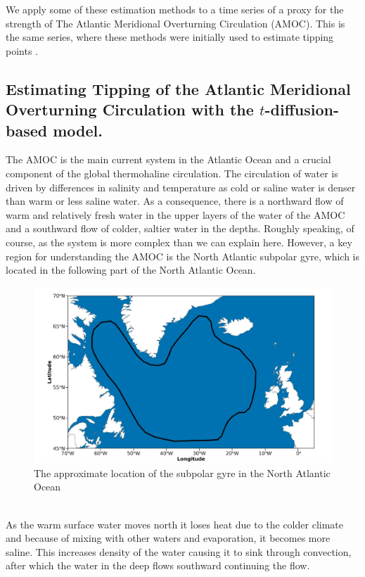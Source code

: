 We apply some of these estimation methods to a time series of a proxy for the strength of The Atlantic Meridional Overturning Circulation (AMOC). This is the same series,  where these methods were initially used to estimate tipping points \cite{Ditlevsen2023}.
\subsection{Estimating Tipping of the Atlantic Meridional Overturning Circulation with the \texorpdfstring{$t$}{t}-diffusion-based model.}
The AMOC is the main current system in the Atlantic Ocean and a crucial component of the global thermohaline circulation. The circulation of water is driven by differences in salinity and temperature as cold or saline water is denser than warm or less saline water. As a consequence, there is a northward flow of warm and relatively fresh water in the upper layers of the water of the AMOC and a southward flow of colder, saltier water in the depths. Roughly speaking, of course, as the system is more complex than we can explain here. However, a key region for understanding the AMOC is the North Atlantic subpolar gyre, which is located in the following part of the North Atlantic Ocean.
\begin{figure}[h!]
    \begin{center}
        \includegraphics[scale = .175]{figures/NorthAtlanticOcean.jpeg}
    \end{center}
    \caption{The approximate location of the subpolar gyre in the North Atlantic Ocean}
    \label{figure:subpolarGyre}
\end{figure}\\
As the warm surface water moves north it loses heat due to the colder climate and because of mixing with other waters and evaporation, it becomes more saline. This increases density of the water causing it to sink through convection, after which the water in the deep flows southward continuing the flow. 

